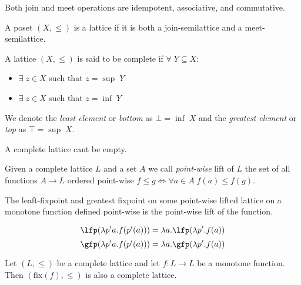 \begin{observation}
  Both join and meet operations are idempotent, associative, and commutative.
\end{observation}

\begin{definition}[Lattice]
  A poset $(X, \leq)$ is a lattice if it is both a join-semilattice and a 
  meet-semilattice.
\end{definition}

\begin{definition}
  A lattice $(X, \leq)$ is said to be complete if $\forall \; Y \subseteq X$:
  \begin{itemize}
    \item $\exists \; z \in X$ such that $z = \sup \; Y$
    \item $\exists \; z \in X$ such that $z = \inf \; Y$
  \end{itemize}

  We denote the \textit{least element} or \textit{bottom} as $\bot = \inf \; X$ 
  and the \textit{greatest element} or \textit{top} as $\top = \sup \; X$.
\end{definition}

\begin{observation}
  A complete lattice cant be empty.
\end{observation}

\begin{definition}
  Given a complete lattice $L$ and a set $A$ we call \textit{point-wise} lift
  of $L$ the set of all functions $A \to L$ ordered point-wise $f \leq g \iff
  \forall a \in A \; f(a) \leq f(g)$.
\end{definition}

\begin{theorem}
  The leaft-fixpoint and greatest fixpoint on some point-wise lifted lattice on 
  a monotone function defined point-wise is the point-wise lift of the function.

  $$\lfp(\lambda p' a . f(p'(a))) = \lambda a . \lfp(\lambda p' . f(a))$$
  $$\gfp(\lambda p' a . f(p'(a))) = \lambda a . \gfp(\lambda p' . f(a))$$
\end{theorem}

\begin{theorem}
  \label{thm:knaster}
  Let $(L, \leq)$ be a complete lattice and let $f : L \to L$ be a monotone 
  function. Then $(\text{fix}(f), \leq)$ is also a complete lattice.
\end{theorem}


